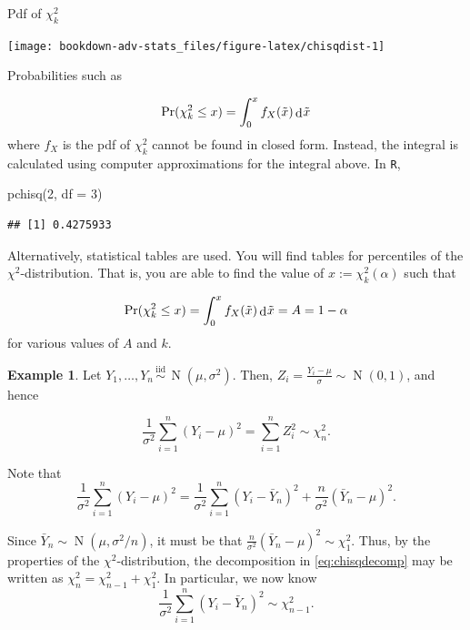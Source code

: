 \documentclass[
]{book}
\newenvironment{Shaded}{\begin{snugshade}}{\end{snugshade}}
\newcommand{\AttributeTok}[1]{\textcolor[rgb]{0.77,0.63,0.00}{#1}}
\newcommand{\DecValTok}[1]{\textcolor[rgb]{0.00,0.00,0.81}{#1}}
\newcommand{\FunctionTok}[1]{\textcolor[rgb]{0.00,0.00,0.00}{#1}}
\newcommand{\NormalTok}[1]{#1}
\DeclareMathOperator{\N}{N}
\newcommand{\iid}{\,\overset{\text{iid}}{\sim}\,}
\DeclareMathOperator{\dd}{d}
\newcommand{\dint}{\dd\hspace{0.5pt}\!}
\theoremstyle{definition}
\theoremstyle{definition}
\newtheorem{example}{Example}[chapter]
\theoremstyle{definition}
\theoremstyle{definition}
\theoremstyle{remark}
\begin{document}
Pdf of \(\chi^2_k\)

\begin{center}\texttt{[image: bookdown-adv-stats\_files/figure-latex/chisqdist-1]} \end{center}

Probabilities such as

\[\Pr(\chi_k^2 \leq x) = \int_0^x f_X(\tilde x) \dint \tilde x\] where \(f_X\) is the pdf of \(\chi^2_k\) cannot be found in closed form.
Instead, the integral is calculated using computer approximations for the integral above.
In \texttt{R},

\begin{Shaded}
\begin{Highlighting}[]
\FunctionTok{pchisq}\NormalTok{(}\DecValTok{2}\NormalTok{, }\AttributeTok{df =} \DecValTok{3}\NormalTok{)}
\end{Highlighting}
\end{Shaded}

\begin{verbatim}
## [1] 0.4275933
\end{verbatim}

Alternatively, statistical tables are used.
You will find tables for percentiles of the \(\chi^2\)-distribution.
That is, you are able to find the value of \(x:=\chi^2_k(\alpha)\) such that

\[\Pr(\chi_k^2 \leq x) = \int_0^x f_X(\tilde x) \dint \tilde x = A = 1-\alpha\]
for various values of \(A\) and \(k\).

\begin{example}
Let \(Y_1,\dots,Y_n\iid \N(\mu,\sigma^2)\).
Then, \(Z_i = \frac{Y_i-\mu}{\sigma} \sim \N(0,1)\), and hence

\[\frac{1}{\sigma^2} \sum_{i=1}^n (Y_i-\mu)^2 = \sum_{i=1}^n Z_i^2 \sim \chi^2_n .\]

Note that
\begin{equation}
    \frac{1}{\sigma^2} \sum_{i=1}^n (Y_i-\mu)^2
    = \frac{1}{\sigma^2} \sum_{i=1}^n (Y_i-\bar Y_n)^2 +  \frac{n}{\sigma^2} (\bar Y_n -\mu)^2. \label{eq:chisqdecomp}
\end{equation}

Since \(\bar Y_n \sim \N(\mu, \sigma^2/n)\), it must be that
\(\frac{n}{\sigma^2} (\bar Y_n -\mu)^2 \sim \chi^2_1\).
Thus, by the properties of the \(\chi^2\)-distribution, the decomposition in \eqref{eq:chisqdecomp} may be written as
\(\chi^2_n = \chi^2_{n-1} + \chi^2_{1}\).
In particular, we now know
\[\frac{1}{\sigma^2} \sum_{i=1}^n (Y_i-\bar Y_n)^2 \sim \chi^2_{n-1} .\]
\end{example}
\end{document}
